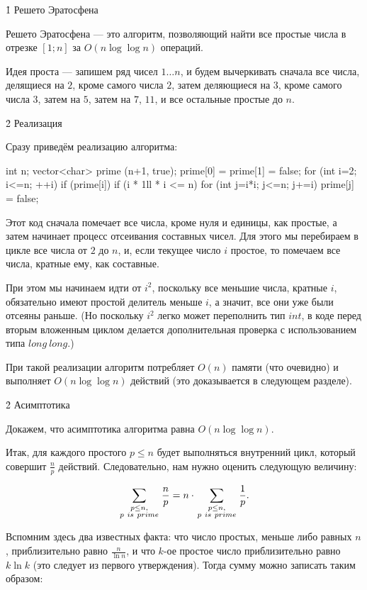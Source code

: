 \h1{ Решето Эратосфена }

Решето Эратосфена --- это алгоритм, позволяющий найти все простые числа в отрезке $[1; n]$ за $O (n \log \log n)$ операций.

Идея проста --- запишем ряд чисел $1 \ldots n$, и будем вычеркивать сначала все числа, делящиеся на $2$, кроме самого числа $2$, затем деляющиеся на $3$, кроме самого числа $3$, затем на $5$, затем на $7$, $11$, и все остальные простые до $n$.


\h2{ Реализация }

Сразу приведём реализацию алгоритма:

\code
int n;
vector<char> prime (n+1, true);
prime[0] = prime[1] = false;
for (int i=2; i<=n; ++i)
	if (prime[i])
		if (i * 1ll * i <= n)
			for (int j=i*i; j<=n; j+=i)
				prime[j] = false;
\endcode

Этот код сначала помечает все числа, кроме нуля и единицы, как простые, а затем начинает процесс отсеивания составных чисел. Для этого мы перебираем в цикле все числа от $2$ до $n$, и, если текущее число $i$ простое, то помечаем все числа, кратные ему, как составные.

При этом мы начинаем идти от $i^2$, поскольку все меньшие числа, кратные $i$, обязательно имеют простой делитель меньше $i$, а значит, все они уже были отсеяны раньше. (Но поскольку $i^2$ легко может переполнить тип $int$, в коде перед вторым вложенным циклом делается дополнительная проверка с использованием типа $long~long$.)

При такой реализации алгоритм потребляет $O (n)$ памяти (что очевидно) и выполняет $O (n \log \log n)$ действий (это доказывается в следующем разделе).


\h2{ Асимптотика }

Докажем, что асимптотика алгоритма равна $O (n \log \log n)$.

Итак, для каждого простого $p \le n$ будет выполняться внутренний цикл, который совершит $\frac{n}{p}$ действий. Следовательно, нам нужно оценить следующую величину:

$$ \sum_{ \scriptstyle p \le n, \atop\scriptstyle p~is~prime } \frac{n}{p} = n \cdot \sum_{ \scriptstyle p \le n, \atop\scriptstyle p~is~prime } \frac{1}{p}. $$

Вспомним здесь два известных факта: что число простых, меньше либо равных $n$, приблизительно равно $\frac{n}{\ln n}$, и что $k$-ое простое число приблизительно равно $k \ln k$ (это следует из первого утверждения). Тогда сумму можно записать таким образом:

